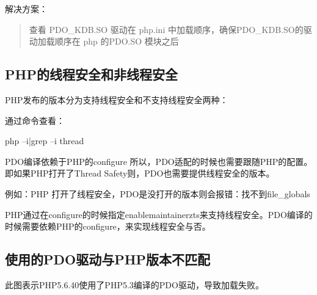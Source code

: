 \documentclass[a4,10pt,oneside,english]{sphinxmanual}
\begin{document}
解决方案：
\begin{quote}

查看 PDO\_KDB.SO 驱动在 php.ini 中加载顺序，确保PDO\_KDB.SO的驱动加载顺序在 php 的PDO.SO 模块之后
\end{quote}


\subsection{PHP的线程安全和非线程安全}
\label{\detokenize{interface/pdo:php}}
PHP发布的版本分为支持线程安全和不支持线程安全两种：

通过命令查看：

\begin{sphinxVerbatim}[commandchars=\\\{\}]
php –i|grep –i thread
\end{sphinxVerbatim}

\begin{figure}[H]
\centering

\noindent{}
\end{figure}

PDO编译依赖于PHP的configure  所以，PDO适配的时候也需要跟随PHP的配置。即如果PHP打开了Thread  Safety则，PDO也需要提供线程安全的版本。

\begin{figure}[H]
\centering

\noindent{}
\end{figure}

例如：PHP 打开了线程安全，PDO是没打开的版本则会报错：找不到file\_globals

PHP通过在configure的时候指定\sphinxhyphen{}\sphinxhyphen{}enable\sphinxhyphen{}maintainer\sphinxhyphen{}zts来支持线程安全。PDO编译的时候需要依赖PHP的configure，来实现线程安全与否。


\subsection{使用的PDO驱动与PHP版本不匹配}
\label{\detokenize{interface/pdo:pdophp}}
\begin{figure}[H]
\centering

\noindent{}
\end{figure}

此图表示PHP5.6.40使用了PHP5.3编译的PDO驱动，导致加载失败。

\begin{sphinxVerbatim}[commandchars=\\\{\}]
    
    
\end{sphinxVerbatim}
\end{document}
